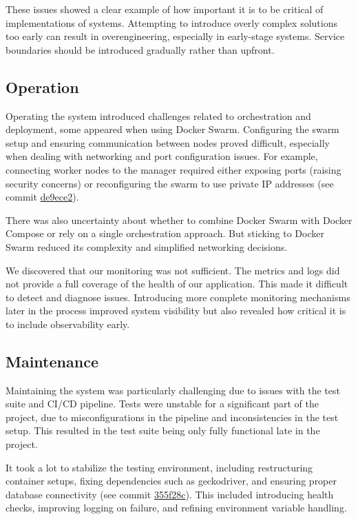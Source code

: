 These issues showed a clear example of how important it is to be critical of implementations of systems. Attempting to introduce overly complex solutions too early can result in overengineering, especially in early-stage systems. Service boundaries should be introduced gradually rather than upfront. 

\subsection{Operation}

Operating the system introduced challenges related to orchestration and deployment, some appeared when using Docker Swarm. Configuring the swarm setup and ensuring communication between nodes proved difficult, especially when dealing with networking and port configuration issues. For example, connecting worker nodes to the manager required either exposing ports (raising security concerns) or reconfiguring the swarm to use private IP addresses (see commit \href{https://github.com/sebsthiel/minitwit-devops/commit/de9ece2321d66eeb74f87014aebf46655bbc92cb}{de9ece2}).

There was also uncertainty about whether to combine Docker Swarm with Docker Compose or rely on a single orchestration approach. But sticking to Docker Swarm reduced its complexity and simplified networking decisions.

We discovered that our monitoring was not sufficient. The metrics and logs did not provide a full coverage of the health of our application.  
This made it difficult to detect and diagnose issues. Introducing more complete monitoring mechanisms later in the process improved system visibility but also revealed how critical it is to include observability early.

\subsection{Maintenance}

Maintaining the system was particularly challenging due to issues with the test suite and CI/CD pipeline. Tests were unstable for a significant part of the project, due to misconfigurations in the pipeline and inconsistencies in the test setup. This resulted in the test suite being only fully functional late in the project.

It took a lot to stabilize the testing environment, including restructuring container setups, fixing dependencies such as geckodriver, and ensuring proper database connectivity (see commit  \href{https://github.com/sebsthiel/minitwit-devops/commit/355f28c316aa33d9a324e6a0f35a3c6d165aa6f5}{355f28c}). This included introducing health checks, improving logging on failure, and refining environment variable handling.

